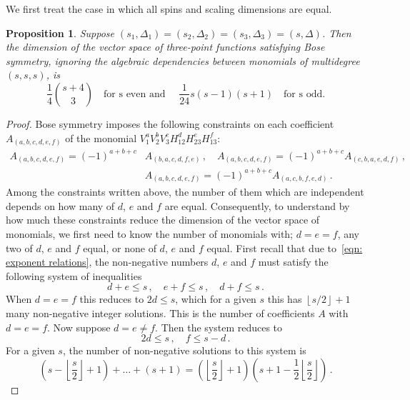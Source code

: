 \documentclass[12pt,a4paper]{extarticle}
\newtheorem{proposition}[theorem]{Proposition}
\theoremstyle{definition}
\begin{document}
We first treat the case in which all spins and scaling dimensions are equal.
\begin{proposition} \label{prop:Bose_threespins}
Suppose $(s_1,\Delta_1)=(s_2,\Delta_2)=(s_3,\Delta_3)=(s,\Delta)$. Then the dimension of the vector space of three-point functions satisfying Bose symmetry, ignoring the algebraic dependencies between monomials of multidegree $(s,s,s)$, is 
\begin{equation}
   \frac{1}{4}\binom{s+4}{3} \quad \text{for s even and } \quad \frac{1}{24}s(s-1)(s+1) \quad \text{for s odd.}
\end{equation}
\end{proposition}
\begin{proof}
   Bose symmetry imposes the following constraints on each coefficient $A_{(a,b,c,d,e,f)}$ of the monomial $V_1^aV_2^bV_3^cH_{12}^dH_{23}^eH_{13}^f$:
    \begin{equation*}
    \begin{split}
        A_{(a,b,c,d,e,f)}=(-1)^{a+b+c}&A_{(b,a,c,d,f,e)}\,,\quad A_{(a,b,c,d,e,f)}=(-1)^{a+b+c}A_{(c,b,a,e,d,f)}\,,\\
        &A_{(a,b,c,d,e,f)}=(-1)^{a+b+c}A_{(a,c,b,f,e,d)}\,.
    \end{split}
    \end{equation*}
    Among the constraints written above, the number of them which are independent depends on how many of $d$, $e$ and $f$ are equal. Consequently, to understand by how much these constraints reduce the dimension of the vector space of monomials, we first need to know the number of monomials with; $d=e=f$, any two of $d$, $e$ and $f$ equal, or none of $d$, $e$ and $f$ equal. First recall that due to~\eqref{eqn: exponent relations}, the non-negative numbers $d$, $e$ and $f$ must satisfy the following system of inequalities
    \begin{equation*}
        d+e\leq s\,,\quad e+f\leq s\,,\quad d+f\leq s\,.
    \end{equation*}
    When $d=e=f$ this reduces to $2d\le s$, which for a given $s$ this has $\left\lfloor s/2 \right\rfloor+1$ many non-negative integer solutions. This is the number of coefficients $A$ with $d=e=f$. Now suppose $d=e\neq f$. Then the system reduces to
    \begin{equation*}
            2d\leq s\,,\quad f\leq s-d\,.
    \end{equation*}
    For a given $s$, the number of non-negative solutions to this system is 
    $$\left(s-\left\lfloor\dfrac{s}{2}\right\rfloor+1\right)+\ldots+(s+1)=\left(\left\lfloor\dfrac{s}{2}\right\rfloor + 1\right)\left(s+1-\frac{1}{2}\left\lfloor\frac{s}{2}\right\rfloor\right)\,.$$

\end{proof}
\end{document}
